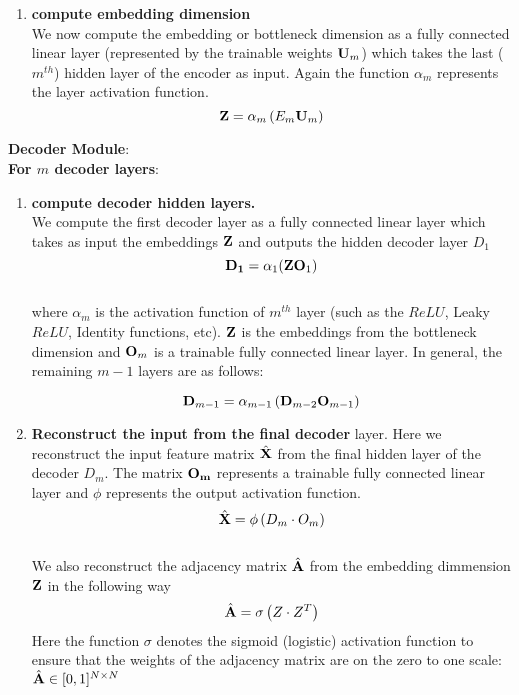 \documentclass[a4paper,12pt]{article}
\newcommand{\forceindent}{\leavevmode{\parindent=2em\indent}}
\begin{document}
\begin{itemize}
\begin{enumerate}
{\begin{enumerate}
				\item[]{\textbf{compute embedding dimension} \\
					We now compute the embedding or bottleneck dimension as a fully connected linear layer (represented by the trainable weights ${\bf U}_m$) which takes the last ($m^{th}$) hidden layer of the encoder as input. Again the function $\alpha_{m}$ represents the layer activation function.  
					\[ {\bf Z} = \alpha_{m}\left(E_{m}  {\bf U}_m\right) \]} 
			\end{enumerate}
			\forceindent \textbf{Decoder Module}: \\
			\forceindent \textbf{For $m$ decoder layers}:
			\begin{enumerate}
				\item[]{\textbf{compute decoder hidden layers.}\\
					We compute the first decoder layer as a fully connected linear layer which takes as input the embeddings $\bf Z$ and outputs the hidden decoder layer $D_1$ 
					\[ {\bf D_1} = \alpha_1({\bf ZO}_1)\]
					\\
					where $\alpha_m$ is the activation function of $m^{th}$ layer (such as the $ReLU$, Leaky $ReLU$, Identity functions, etc). $\bf Z$ is the embeddings from the bottleneck dimension and ${\bf O}_m$ is a trainable fully connected linear layer. In general, the remaining $m-1$ layers are as follows:
					
					\[{\bf D}_{m-1} = \alpha_{m-1}\left({\bf D}_{m-2}{\bf O}_{m-1}\right)\]}
				
				\item[]{\textbf{Reconstruct the input from the final decoder} layer. Here we reconstruct the input feature matrix $\hat{\bf X}$ from the final hidden layer of the decoder $D_m$. The matrix ${\bf O_m}$ represents a trainable fully connected linear layer and $\phi$ represents the output activation function. 
					\[\hat{\bf X} = \phi\left(D_m\cdot O_m\right)\]
					\\
					We also reconstruct the adjacency matrix $\hat{\bf A}$ from the embedding dimmension $\bf Z$ in the following way
					\[\hat{\bf A} = \sigma\left(Z\cdot Z^T\right) \]
					Here the function $\sigma$ denotes the sigmoid (logistic) activation function to ensure that the weights of the adjacency matrix are on the zero to one scale: $\hat{\bf A} \in [0,1]^{N\times N}$
				}
					

\end{enumerate}}
\end{enumerate}
\end{itemize}
\end{document}
